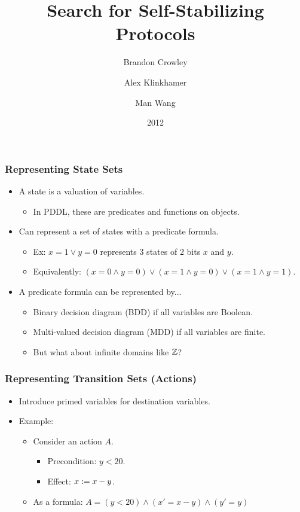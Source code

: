 \documentclass[handout]{beamer}
\title{Search for Self-Stabilizing Protocols}
\author{Brandon Crowley \and Alex Klinkhamer \and Man Wang}
\institute{Michigan Technological University}
\date{2012}
\begin{document}
\setlength{\abovedisplayskip}{0.5em}
\setlength{\abovedisplayshortskip}{0.5em}
\setlength{\belowdisplayskip}{0.5em}
\setlength{\belowdisplayshortskip}{0.5em}

\begin{frame}
\titlepage
\end{frame}

\begin{frame}
\frametitle{Representing State Sets}
\begin{itemize}
\item A state is a valuation of variables.
 \begin{itemize}
 \item In PDDL, these are predicates and functions on objects.
 \end{itemize}
\pause \item Can represent a set of states with a predicate formula.
 \begin{itemize}
 \item Ex: $x=1\vee y=0$ represents $3$ states of $2$ bits $x$ and $y$.
 \item Equivalently: $(x=0\wedge y=0) \vee (x=1\wedge y=0) \vee (x=1\wedge y=1)$.
 \end{itemize}
\item A predicate formula can be represented by...
 \begin{itemize}
 \pause \item Binary decision diagram (BDD) if all variables are Boolean.
 \pause \item Multi-valued decision diagram (MDD) if all variables are finite.
 \pause \item But what about infinite domains like $\mathbb{Z}$?
 \end{itemize}
\end{itemize}
\end{frame}

\begin{frame}
\frametitle{Representing Transition Sets (Actions)}
\begin{itemize}
\item Introduce primed variables for destination variables.
\item Example:
 \begin{itemize}
 \item Consider an action $A$.
  \begin{itemize}
  \item[] Precondition: $y < 20$.
  \item[] Effect: $x := x - y$.
  \end{itemize}
 \item As a formula: $A = (y < 20) \wedge (x' = x - y) \wedge (y' = y)$
 \end{itemize}
\end{itemize}
\end{frame}
\end{document}
